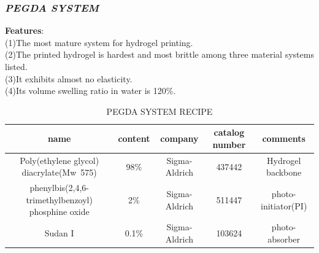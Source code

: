 \documentclass[a4paper]{article}
\begin{document}
\begin{itemize}
  \subsubsection{\textit{PEGDA SYSTEM}}
  \textbf{Features}:\\
  (1)The most mature system for hydrogel printing.\\
  (2)The printed hydrogel is hardest and most brittle among three material systems listed.  \\
  (3)It exhibits almost no elasticity. \\
  (4)Its volume swelling ratio in water is 120\%.\\
  \begin{table}
    \begin{center}
      \begin{tabular}{ | c | c | c | c | c |}
        \hline
        \textbf{name}&\textbf{content}&\textbf{company}&\textbf{catalog number}&\textbf{comments} \\ 
        \hline
        Poly(ethylene glycol) diacrylate(Mw~575)&98\%&Sigma-Aldrich&437442&Hydrogel backbone \\     
        \hline
        phenylbis(2,4,6-trimethylbenzoyl) phosphine oxide&2\%&Sigma-Aldrich&511447&photo-initiator(PI) \\
        \hline
        Sudan I&0.1\%&Sigma-Aldrich&103624&photo-absorber \\
        \hline
      \end{tabular}
      \caption{PEGDA SYSTEM RECIPE}
    \end{center}
  \end{table}


\end{itemize}
\end{document}
